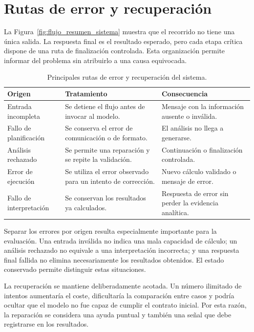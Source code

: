 \section{Rutas de error y recuperación}

La Figura~\ref{fig:flujo_resumen_sistema} muestra que el recorrido no tiene una única salida. La respuesta final es el resultado esperado, pero cada etapa crítica dispone de una ruta de finalización controlada. Esta organización permite informar del problema sin atribuirlo a una causa equivocada.

\begin{table}[H]
\centering
\small
\begin{tabularx}{\textwidth}{L{0.25\textwidth}L{0.31\textwidth}Y}
\toprule
\textbf{Origen} & \textbf{Tratamiento} & \textbf{Consecuencia} \\
\midrule
Entrada incompleta & Se detiene el flujo antes de invocar al modelo. & Mensaje con la información ausente o inválida. \\
Fallo de planificación & Se conserva el error de comunicación o de formato. & El análisis no llega a generarse. \\
Análisis rechazado & Se permite una reparación y se repite la validación. & Continuación o finalización controlada. \\
Error de ejecución & Se utiliza el error observado para un intento de corrección. & Nuevo cálculo validado o mensaje de error. \\
Fallo de interpretación & Se conservan los resultados ya calculados. & Respuesta de error sin perder la evidencia analítica. \\
\bottomrule
\end{tabularx}
\caption{Principales rutas de error y recuperación del sistema.}
\label{tab:rutas_error_diseno}
\end{table}

Separar los errores por origen resulta especialmente importante para la evaluación. Una entrada inválida no indica una mala capacidad de cálculo; un análisis rechazado no equivale a una interpretación incorrecta; y una respuesta final fallida no elimina necesariamente los resultados obtenidos. El estado conservado permite distinguir estas situaciones.

La recuperación se mantiene deliberadamente acotada. Un número ilimitado de intentos aumentaría el coste, dificultaría la comparación entre casos y podría ocultar que el modelo no fue capaz de cumplir el contrato inicial. Por esta razón, la reparación se considera una ayuda puntual y también una señal que debe registrarse en los resultados.

